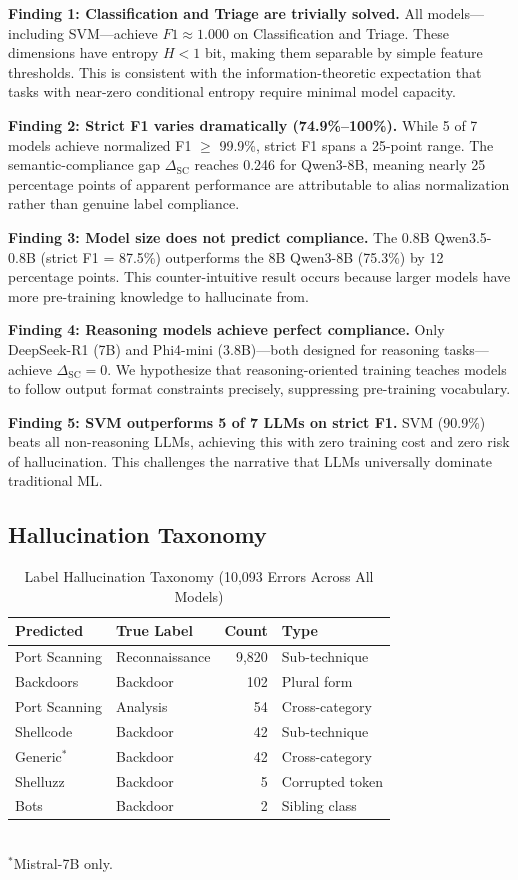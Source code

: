 \documentclass[journal]{IEEEtran}
\begin{document}
\textbf{Finding 1: Classification and Triage are trivially solved.} All models---including SVM---achieve $F1 \approx 1.000$ on Classification and Triage. These dimensions have entropy $H < 1$ bit, making them separable by simple feature thresholds. This is consistent with the information-theoretic expectation that tasks with near-zero conditional entropy require minimal model capacity.

\textbf{Finding 2: Strict F1 varies dramatically (74.9\%--100\%).} While 5 of 7 models achieve normalized F1 $\geq$ 99.9\%, strict F1 spans a 25-point range. The semantic-compliance gap $\Delta_\text{SC}$ reaches 0.246 for Qwen3-8B, meaning nearly 25 percentage points of apparent performance are attributable to alias normalization rather than genuine label compliance.

\textbf{Finding 3: Model size does not predict compliance.} The 0.8B Qwen3.5-0.8B (strict F1 = 87.5\%) outperforms the 8B Qwen3-8B (75.3\%) by 12 percentage points. This counter-intuitive result occurs because larger models have more pre-training knowledge to hallucinate from.

\textbf{Finding 4: Reasoning models achieve perfect compliance.} Only DeepSeek-R1 (7B) and Phi4-mini (3.8B)---both designed for reasoning tasks---achieve $\Delta_\text{SC} = 0$. We hypothesize that reasoning-oriented training teaches models to follow output format constraints precisely, suppressing pre-training vocabulary.

\textbf{Finding 5: SVM outperforms 5 of 7 LLMs on strict F1.} SVM (90.9\%) beats all non-reasoning LLMs, achieving this with zero training cost and zero risk of hallucination. This challenges the narrative that LLMs universally dominate traditional ML.

\subsection{Hallucination Taxonomy}

\begin{table}[!ht]
\centering
\caption{Label Hallucination Taxonomy (10,093 Errors Across All Models)}
\label{tab:halluc}
\begin{tabular}{llrl}
\toprule
\textbf{Predicted} & \textbf{True Label} & \textbf{Count} & \textbf{Type} \\
\midrule
Port Scanning & Reconnaissance & 9,820 & Sub-technique \\
Backdoors & Backdoor & 102 & Plural form \\
Port Scanning & Analysis & 54 & Cross-category \\
Shellcode & Backdoor & 42 & Sub-technique \\
Generic$^*$ & Backdoor & 42 & Cross-category \\
Shelluzz & Backdoor & 5 & Corrupted token \\
Bots & Backdoor & 2 & Sibling class \\
\bottomrule
\end{tabular}
\\\smallskip\small $^*$Mistral-7B only.
\end{table}
\end{document}
